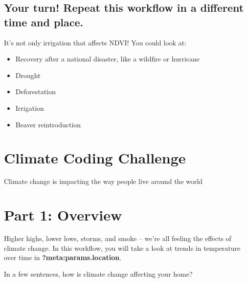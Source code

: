 \documentclass[
  letterpaper,
  DIV=11,
  numbers=noendperiod,
  oneside]{scrreprt}
\providecommand{\tightlist}{%
  \setlength{\itemsep}{0pt}\setlength{\parskip}{0pt}}
\begin{document}
\section{Your turn! Repeat this workflow in a different time and
place.}\label{your-turn-repeat-this-workflow-in-a-different-time-and-place.-1}

It's not only irrigation that affects NDVI! You could look at:

\begin{itemize}
\tightlist
\item
  Recovery after a national disaster, like a wildfire or hurricane
\item
  Drought
\item
  Deforestation
\item
  Irrigation
\item
  Beaver reintroduction
\end{itemize}


\chapter{Climate Coding Challenge}\label{climate-coding-challenge-1}

Climate change is impacting the way people live around the world

\hfill\break


\chapter{Part 1: Overview}\label{part-1-overview-1}

Higher highs, lower lows, storms, and smoke -- we're all feeling the
effects of climate change. In this workflow, you will take a look at
trends in temperature over time in \textbf{?meta:params.location}.

\begin{tcolorbox}[enhanced jigsaw, colbacktitle=quarto-callout-color!10!white, opacityback=0, bottomtitle=1mm, toptitle=1mm, bottomrule=.15mm, left=2mm, colframe=quarto-callout-color-frame, leftrule=.75mm, opacitybacktitle=0.6, colback=white, rightrule=.15mm, toprule=.15mm, breakable, titlerule=0mm, title=\textcolor{quarto-callout-color}{\faInfo}\hspace{0.5em}{Conversation Starter}, coltitle=black, arc=.35mm]

In a few sentences, how is climate change affecting your home?

\end{tcolorbox}
\end{document}
